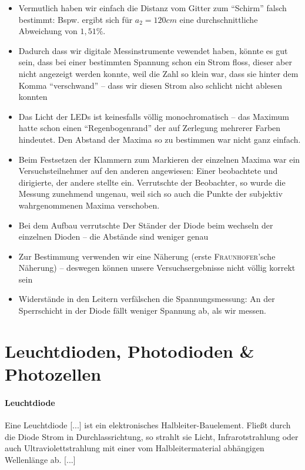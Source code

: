 \begin{itemize}
   \item Vermutlich haben wir einfach die Distanz vom Gitter zum "`Schirm"' falsch bestimmt: Bspw. ergibt sich für $a_2 = 120cm$ eine durchschnittliche Abweichung von $1,51\%$.
   \item Dadurch dass wir digitale Messinstrumente vewendet haben, könnte es gut sein, dass bei einer bestimmten Spannung schon ein Strom floss, dieser aber nicht angezeigt werden konnte, weil die Zahl so klein war, dass sie hinter dem Komma "`verschwand"' -- dass wir diesen Strom also schlicht nicht ablesen konnten
   \item Das Licht der LEDs ist keinesfalls völlig monochromatisch -- das Maximum hatte schon einen "`Regenbogenrand"' der auf Zerlegung mehrerer Farben hindeutet. Den Abstand der Maxima so zu bestimmen war nicht ganz einfach.
   \item Beim Festsetzen der Klammern zum Markieren der einzelnen Maxima war ein Versuchsteilnehmer auf den anderen angewiesen: Einer beobachtete und dirigierte, der andere stellte ein. Verrutschte der Beobachter, so wurde die Messung zunehmend ungenau, weil sich so auch die Punkte der subjektiv wahrgenommenen Maxima verschoben.
   \item Bei dem Aufbau verrutschte Der Ständer der Diode beim wechseln der einzelnen Dioden -- die Abstände sind weniger genau
   \item Zur Bestimmung verwenden wir eine Näherung (erste \textsc{Fraunhofer}'sche Näherung) -- deswegen können unsere Versuchsergebnisse nicht völlig korrekt sein
   \item Widerstände in den Leitern verfälschen die Spannungsmessung: An der Sperrschicht in der Diode fällt weniger Spannung ab, als wir messen.

\end{itemize}





\section{Leuchtdioden, Photodioden \& Photozellen}


\paragraph{Leuchtdiode}

Eine Leuchtdiode [...] ist ein elektronisches Halbleiter-Bauelement. Fließt durch die Diode Strom in Durchlassrichtung, so strahlt sie Licht, Infrarotstrahlung oder auch Ultraviolettstrahlung mit einer vom Halbleitermaterial abhängigen Wellenlänge ab. [...]

